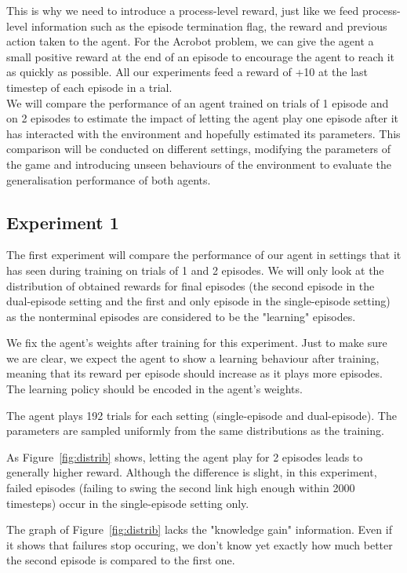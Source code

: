 \documentclass[letterpaper]{article}
\begin{document}
This is why we need to introduce a process-level reward, just like we feed
process-level information such as the episode termination flag, the reward
and previous action taken to the agent. For the Acrobot problem, we can
give the agent a small positive reward at the end of an episode to encourage
the agent to reach it as quickly as possible. All our experiments feed a
reward of +10 at the last timestep of each episode in a trial.\\

We will compare the performance of an agent trained on trials of 1 episode
and on 2 episodes to estimate the impact of letting the agent play one episode
after it has interacted with the environment and hopefully estimated
its parameters. This comparison will be conducted on different settings,
modifying the parameters of the game and introducing unseen behaviours of
the environment to evaluate the generalisation performance of both agents.

\subsection{Experiment 1}
The first experiment will compare the performance of our agent in settings
that it has seen during training on trials of 1 and 2 episodes. We will only
look at the distribution of obtained rewards for final episodes (the second 
episode in the dual-episode setting and the first and only episode in the
single-episode setting) as the nonterminal episodes are considered to be the 
"learning" episodes.

We fix the agent's weights after training for this experiment. Just to make sure
we are clear, we expect the agent to show a learning behaviour after training,
meaning that its reward per episode should increase as it plays more episodes.
The learning policy should be encoded in the agent's weights.

The agent plays 192 trials for each setting (single-episode and dual-episode).
The parameters are sampled uniformly from the same distributions as the training.

As Figure~\ref{fig:distrib} shows, letting the agent play for 2 episodes
leads to generally higher reward. Although the difference is slight, 
in this experiment, failed episodes (failing
to swing the second link high enough within 2000 timesteps) occur in the
single-episode setting only.

The graph of Figure~\ref{fig:distrib} lacks the "knowledge gain" information.
Even if it shows that failures stop occuring, we don't know yet exactly how
much better the second episode is compared to the first one.
\end{document}
